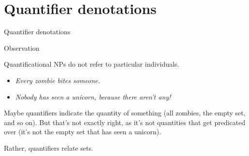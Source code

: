 \documentclass[xcolor=dvipsnames]{beamer}
\begin{document}
\begin{comment}


\begin{frame}{Semantically motivated syntax --- Example: Relative clauses}

{\small 
\Tree [.NP {DET\\ {\tt a}} !\qsetw{-1cm} {N\\ {\tt robot}} !\qsetw{1cm} \qroof{{\tt that cheered}}.REL ]

\begin{tabular}{cc}
\Tree [.NP {DET\\ {\tt a}} 
           !\qsetw{0cm}
           [.N {N\\ {\tt robot}} 
               \qroof{{\tt that cheered}}.REL ] ]
&
\Tree [.NP [.NP {DET\\ {\tt a}} 
                {N\\ {\tt robot}} ]
           \qroof{{\tt that cheered}}.REL ]
\\
\end{tabular}}
\end{frame}

\end{comment}


\section{Quantifier denotations}

\begin{frame}{}

\begin{center}\Large
Quantifier denotations
\end{center}
\end{frame}

\begin{frame}{Observation}

{Quantificational NPs} do not refer to particular individuals.
\begin{itemize}
\item {\em {Every zombie} bites {someone}.}
\item {\em {Nobody} has seen {a unicorn}, because there aren't any!}
\end{itemize}

Maybe quantifiers indicate the quantity of something (all zombies, the empty set, and so on). 
But that's not exactly right, as it's not quantities that get predicated over (it's not the empty 
set that has seen a unicorn).

Rather, {quantifiers relate sets}.
\end{frame}
\end{document}
